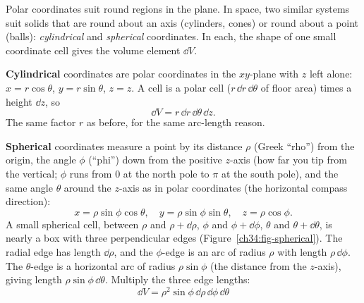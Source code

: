 Polar coordinates suit round regions in the plane. In space, two similar systems
suit solids that are round about an axis (cylinders, cones) or round about a
point (balls): \emph{cylindrical} and \emph{spherical} coordinates. In each, the
shape of one small coordinate cell gives the volume element $\dd V$.

\textbf{Cylindrical} coordinates are polar coordinates in the $xy$-plane with $z$ left
alone: $x=r\cos\theta$, $y=r\sin\theta$, $z=z$. A cell is a polar cell
($r\,\dd r\,\dd\theta$ of floor area) times a height $\dd z$, so
\[
  \dd V=r\,\dd r\,\dd\theta\,\dd z .
\]
The same factor $r$ as before, for the same arc-length reason.

\textbf{Spherical} coordinates measure a point by its distance $\rho$ (Greek
``rho'') from the origin, the angle $\phi$ (``phi'') down from the positive
$z$-axis (how far you tip from the vertical; $\phi$ runs from $0$ at the north
pole to $\pi$ at the south pole), and the same angle $\theta$ around the
$z$-axis as in polar coordinates (the horizontal compass direction):
\[
  x=\rho\sin\phi\cos\theta,\quad
  y=\rho\sin\phi\sin\theta,\quad
  z=\rho\cos\phi .
\]
A small spherical cell, between $\rho$ and $\rho+\dd\rho$, $\phi$ and
$\phi+\dd\phi$, $\theta$ and $\theta+\dd\theta$, is nearly a box with three
perpendicular edges (Figure~\ref{ch34:fig-spherical}). The radial edge has length
$\dd\rho$, and the $\phi$-edge is an arc of radius $\rho$ with length
$\rho\,\dd\phi$. The $\theta$-edge is a horizontal arc of radius $\rho\sin\phi$
(the distance from the $z$-axis), giving length $\rho\sin\phi\,\dd\theta$.
Multiply the three edge lengths:
\[
  \boxed{\;\dd V=\rho^2\sin\phi\,\dd\rho\,\dd\phi\,\dd\theta\;}
\]


